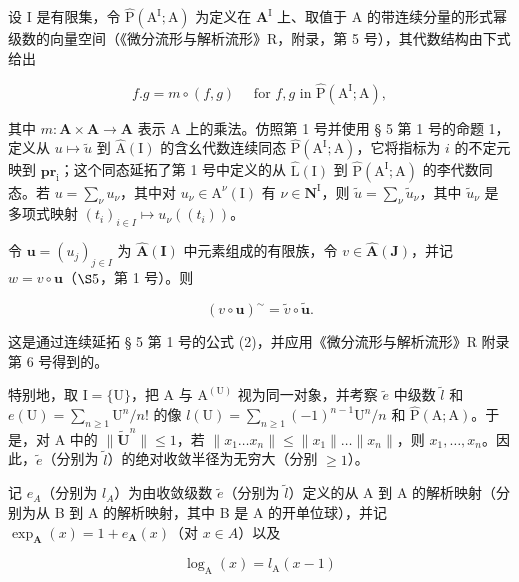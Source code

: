 设 I 是有限集，令 \(\hat{\mathrm{P}} (\mathrm{A}^{\mathrm{I}};\mathrm{A})\) 为定义在 \(\mathbf{A}^{\mathrm{I}}\) 上、取值于 A 的带连续分量的形式幂级数的向量空间（《微分流形与解析流形》R，附录，第 5 号），其代数结构由下式给出

\[
f. g = m \circ (f, g) \quad \text { for } f, g \text { in } \hat {\mathrm{P}} (\mathrm{A} ^ {\mathrm{I}}; \mathrm{A}),
\]

其中 \(m: \mathbf{A} \times \mathbf{A} \to \mathbf{A}\) 表示 A 上的乘法。仿照第 1 号并使用 § 5 第 1 号的命题 1，定义从 \(u \mapsto \tilde{u}\) 到 \(\hat{\mathrm{A}}(\mathrm{I})\) 的含幺代数连续同态 \(\hat{\mathrm{P}}(\mathrm{A}^{\mathrm{I}}; \mathrm{A})\)，它将指标为 \(i\) 的不定元映到 \(\mathbf{pr}_{\mathrm{i}}\)；这个同态延拓了第 1 号中定义的从 \(\hat{\mathrm{L}}(\mathrm{I})\) 到 \(\hat{\mathrm{P}}(\mathrm{A}^{\mathrm{I}}; \mathrm{A})\) 的李代数同态。若 \(u = \sum_{\nu} u_{\nu}\)，其中对 \(u_{\nu} \in \mathrm{A}^{\nu}(\mathrm{I})\) 有 \(\nu \in \mathbf{N}^{\mathrm{I}}\)，则 \(\tilde{u} = \sum_{\nu} \tilde{u}_{\nu}\)，其中 \(\tilde{u}_{\nu}\) 是多项式映射 \((t_{i})_{i \in I} \mapsto u_{\nu}((t_{i}))\)。

令 \(\boldsymbol{u} = (u_{j})_{j \in I}\) 为 \(\hat{\mathbf{A}}(\mathbf{I})\) 中元素组成的有限族，令 \(v \in \hat{\mathbf{A}}(\mathbf{J})\)，并记 \(w = v \circ \boldsymbol{u}\)（\(\S 5\)，第 1 号）。则

\[
(v \circ \boldsymbol {u}) ^ {\sim} = \tilde {v} \circ \tilde {\boldsymbol {u}}.\tag{18}
\]

这是通过连续延拓 § 5 第 1 号的公式 (2)，并应用《微分流形与解析流形》R 附录第 6 号得到的。

特别地，取 \(\mathrm{I} = \{\mathrm{U}\}\)，把 A 与 \(\mathrm{A}^{(\mathrm{U})}\) 视为同一对象，并考察 \(\tilde{e}\) 中级数 \(\tilde{l}\) 和 \(e(\mathrm{U}) = \sum_{n\geqslant 1}\mathrm{U}^n /n!\) 的像 \(l(\mathrm{U}) = \sum_{n\geqslant 1}(-1)^{n - 1}\mathrm{U}^n /n\) 和 \(\hat{\mathrm{P}} (\mathrm{A};\mathrm{A})\)。于是，对 A 中的 \(\| \tilde{\mathbf{U}}^n\| \leqslant 1\)，若 \(\| x_1\dots x_n\| \leqslant \| x_1\| \dots \| x_n\|\)，则 \(x_{1},\ldots ,x_{n}\)。因此，\(\tilde{e}\)（分别为 \(\tilde{l}\)）的绝对收敛半径为无穷大（分别 \(\geqslant 1\)）。

记 \(e_{A}\)（分别为 \(l_{A}\)）为由收敛级数 \(\tilde{e}\)（分别为 \(\tilde{l}\)）定义的从 A 到 A 的解析映射（分别为从 B 到 A 的解析映射，其中 B 是 A 的开单位球），并记 \(\exp_{\mathbf{A}}(x)=1+e_{\mathbf{A}}(x)\)（对 \(x\in A\)）以及

\[
\log_ {\mathrm{A}} (x) = l _ {\mathrm{A}} (x - 1)
\]

